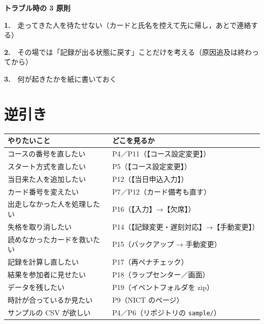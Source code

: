 \documentclass[a4paper,10pt]{ltjsarticle}
\newcommand{\hd}[1]{\textbf{#1}}
\begin{document}
\vspace{3mm}
\begin{tcolorbox}[colback=goalbg,colframe=goalfr,boxrule=0.6pt,arc=2pt]
{\sffamily\bfseries トラブル時の 3 原則}\par\vspace{1mm}
\textbf{1.}　走ってきた人を待たせない（カードと氏名を控えて先に帰し，あとで連絡する）\par
\textbf{2.}　その場では「記録が出る状態に戻す」ことだけを考える（原因追及は終わってから）\par
\textbf{3.}　何が起きたかを紙に書いておく\par
\end{tcolorbox}

\clearpage
\section*{逆引き}

\begin{center}
\small
\begin{tabular}{@{}P{74mm}P{74mm}@{}}
\toprule
\hd{やりたいこと} & \hd{どこを見るか} \\
\midrule
コースの番号を直したい & P4／P11（【コース設定変更】） \\
スタート方式を直したい & P5（【コース設定変更】） \\
当日来た人を追加したい & P12（【当日申込入力】） \\
カード番号を変えたい & P7／P12（カード備考も直す） \\
出走しなかった人を処理したい & P16（【入力】→【欠席】） \\
失格を取り消したい & P14（【記録変更・遅刻対応】→【手動変更】） \\
読めなかったカードを救いたい & P15（バックアップ → 手動変更） \\
記録を計算し直したい & P17（再ペナチェック） \\
結果を参加者に見せたい & P18（ラップセンター／画面） \\
データを残したい & P19（イベントフォルダを zip） \\
時計が合っているか見たい & P9（NICT のページ） \\
サンプルの CSV が欲しい & P4／P6（リポジトリの \texttt{sample/}） \\
\bottomrule
\end{tabular}
\end{center}
\end{document}
